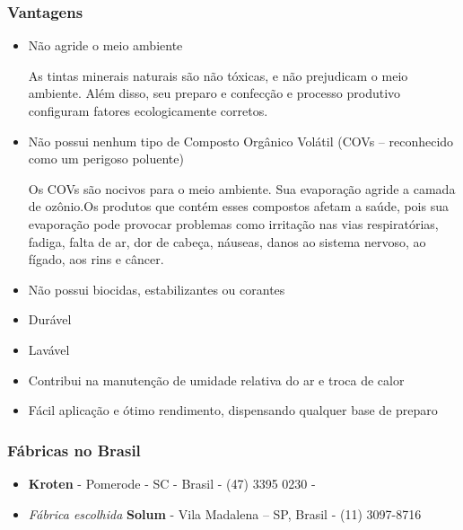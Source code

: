 \subsubsection*{\textbf{Vantagens}}
	
	\begin{itemize}

		\item Não agride o meio ambiente

	As tintas minerais naturais são não tóxicas, e não prejudicam o meio   ambiente. Além disso, seu preparo e confecção e processo produtivo configuram fatores ecologicamente corretos.

		\item Não possui nenhum tipo de Composto Orgânico Volátil (COVs – reconhecido como um perigoso poluente)

	Os COVs são nocivos para o meio ambiente. Sua evaporação agride a camada de ozônio.Os produtos que contém esses compostos afetam a saúde, pois sua evaporação pode provocar problemas como irritação nas vias respiratórias, fadiga, falta de ar, dor de cabeça, náuseas, danos ao sistema nervoso, ao fígado, aos rins e câncer.
 
		\item Não possui biocidas, estabilizantes ou corantes
		
		\item Durável
		
		\item Lavável
		
		\item Contribui na manutenção de umidade relativa do ar e troca de calor
		
		\item Fácil aplicação e ótimo rendimento, dispensando qualquer base de preparo
 
	\end{itemize}

\subsubsection*{\textbf{Fábricas no Brasil}}

	\begin{itemize}

		\item \textbf{Kroten} - Pomerode - SC - Brasil - (47) 3395 0230 -

		\item \textit{Fábrica escolhida} \textbf{Solum} - Vila Madalena – SP,  Brasil -  (11) 3097-8716 

	\end{itemize}

